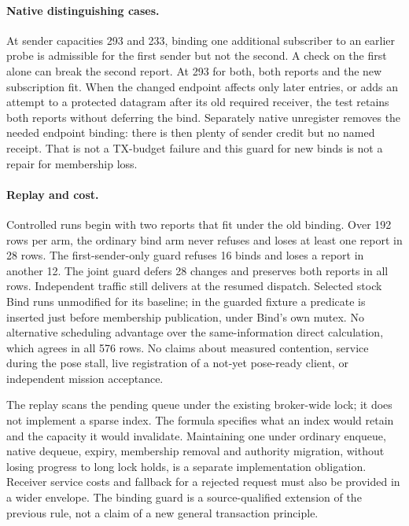 \documentclass[11pt]{article}
\begin{document}
\paragraph{Native distinguishing cases.}
At sender capacities 293 and 233, binding one additional subscriber
to an earlier probe is admissible for the first sender but not the
second. A check on the first alone can break the second report. At
293 for both, both reports and the new subscription fit. When the
changed endpoint affects only later entries, or adds an attempt to a
protected datagram after its old required receiver, the test retains
both reports without deferring the bind. Separately native unregister
removes the needed endpoint binding: there is then plenty of sender
credit but no named receipt. That is not a TX-budget failure and this
guard for new binds is not a repair for membership loss.

\paragraph{Replay and cost.}
Controlled runs begin with two reports that fit under the old binding.
Over 192 rows per arm, the ordinary bind arm never refuses and loses at
least one report in 28 rows. The first-sender-only guard refuses 16
binds and loses a report in another 12. The joint guard defers 28
changes and preserves both reports in all rows. Independent traffic
still delivers at the resumed dispatch. Selected stock Bind runs
unmodified for its baseline; in the guarded fixture a predicate is
inserted just before membership publication, under Bind's own mutex.
No alternative scheduling advantage over the same-information direct
calculation, which agrees in all 576 rows. No claims about measured
contention, service during the pose stall, live registration of a not-yet
pose-ready client, or independent mission acceptance.

The replay scans the pending queue under the existing broker-wide lock;
it does not implement a sparse index. The formula specifies what an
index would retain and the capacity it would invalidate. Maintaining
one under ordinary enqueue, native dequeue, expiry, membership removal
and authority migration, without losing progress to long lock holds,
is a separate implementation obligation. Receiver service costs and
fallback for a rejected request must also be provided in a wider
envelope. The binding guard is a source-qualified extension of the
previous rule, not a claim of a new general transaction principle.
\end{document}
